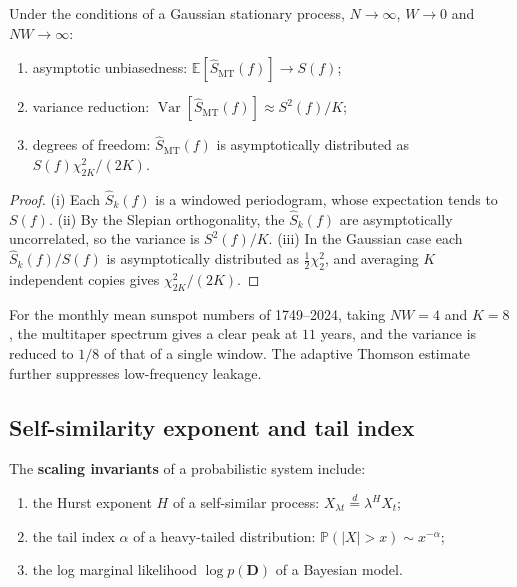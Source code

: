 \begin{proposition}\label{prop:multitaper_consistency}
Under the conditions of a Gaussian stationary process, $N\to\infty$, $W\to0$ and $NW\to\infty$:
\begin{enumerate}[label=(\roman*)]
    \item asymptotic unbiasedness: $\mathbb E[\hat S_{\mathrm{MT}}(f)]\to S(f)$;
    \item variance reduction: $\operatorname{Var}[\hat S_{\mathrm{MT}}(f)]\approx S^2(f)/K$;
    \item degrees of freedom: $\hat S_{\mathrm{MT}}(f)$ is asymptotically distributed as $S(f)\chi^2_{2K}/(2K)$.
\end{enumerate}
\end{proposition}

\begin{proof}
(i) Each $\hat S_k(f)$ is a windowed periodogram, whose expectation tends to $S(f)$.
(ii) By the Slepian orthogonality, the $\hat S_k(f)$ are asymptotically uncorrelated, so the variance is $S^2(f)/K$.
(iii) In the Gaussian case each $\hat S_k(f)/S(f)$ is asymptotically distributed as $\frac12\chi^2_2$, and averaging $K$ independent copies gives $\chi^2_{2K}/(2K)$.
\end{proof}

\begin{example}\label{ex:sunspot_multitaper}
For the monthly mean sunspot numbers of 1749--2024, taking $NW=4$ and $K=8$, the multitaper spectrum gives a clear peak at $11$ years, and the variance is reduced to $1/8$ of that of a single window. The adaptive Thomson estimate further suppresses low-frequency leakage.
\end{example}

\subsection{Self-similarity exponent and tail index}

\begin{definition}\label{def:probability_scaling_charge}
The \textbf{scaling invariants} of a probabilistic system include:
\begin{enumerate}[label=(\roman*)]
    \item the Hurst exponent $H$ of a self-similar process: $X_{\lambda t}\stackrel{d}{=}\lambda^H X_t$;
    \item the tail index $\alpha$ of a heavy-tailed distribution: $\mathbb P(|X|>x)\sim x^{-\alpha}$;
    \item the log marginal likelihood $\log p(\mathbf D)$ of a Bayesian model.
\end{enumerate}
\end{definition}

